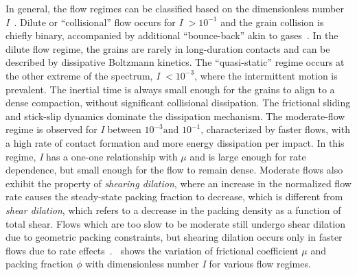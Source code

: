 In general, the flow regimes can be classified based on the dimensionless 
number \textit{I}~\citep{DaCruz2005}. Dilute or ``collisional'' flow occurs for 
\textit{I} $>10^{-1}$ and the grain collision is chiefly binary, 
accompanied  by additional ``bounce-back'' akin to gases~\citep{Kamrin2008}. In 
the dilute flow regime, the grains are rarely in long-duration contacts and 
can be described by dissipative Boltzmann kinetics. The ``quasi-static'' regime 
occurs at the other extreme of the spectrum, \textit{I} $<10^{-3}$, where the 
intermittent motion is prevalent. The inertial time is always small enough for 
the grains to align to a dense compaction, without significant collisional 
dissipation. The frictional sliding and stick-slip dynamics dominate the 
dissipation mechanism. The moderate-flow regime is observed for \textit{I} 
between $10^{-3} \mbox{and }10^{-1}$, characterized by faster flows, with a 
high rate of contact formation and more energy dissipation per impact. In this 
regime, \textit{I} has a one-one relationship with $\mu$ and is large enough 
for rate dependence, but small enough for the flow to remain dense. Moderate 
flows also exhibit the property of \textit{shearing dilation}, where an 
increase in the normalized flow rate causes the steady-state packing fraction 
to decrease, which is different from \textit{shear dilation}, which refers to a 
decrease in the packing density as a function of total shear. Flows which are 
too slow to be moderate still undergo shear dilation due to geometric packing 
constraints, but shearing dilation occurs only in faster flows due to rate 
effects~\citep{Kamrin2008}.~ shows the variation of 
frictional coefficient $\mu$ and packing fraction $\phi$ with dimensionless 
number \textit{I} for various flow regimes. 

